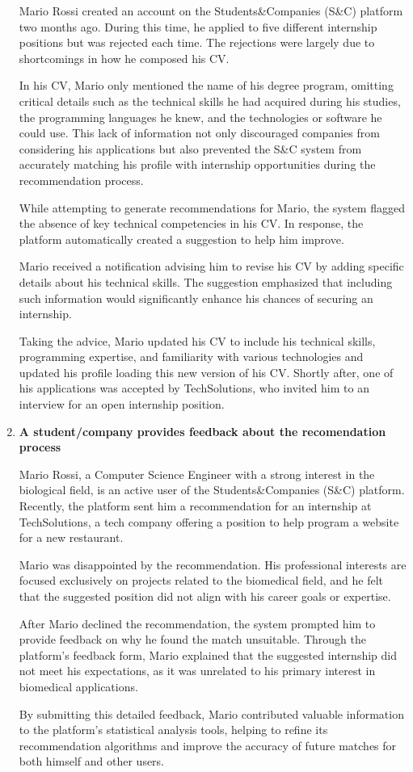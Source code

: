 \begin{enumerate}
     Mario Rossi created an account on the Students\&Companies (S\&C) platform two months ago. During this time, he applied to five different internship positions but was rejected each time. The rejections were largely due to shortcomings in how he composed his CV.

    In his CV, Mario only mentioned the name of his degree program, omitting critical details such as the technical skills he had acquired during his studies, the programming languages he knew, and the technologies or software he could use. This lack of information not only discouraged companies from considering his applications but also prevented the S\&C system from accurately matching his profile with internship opportunities during the recommendation process.

    While attempting to generate recommendations for Mario, the system flagged the absence of key technical competencies in his CV. In response, the platform automatically created a suggestion to help him improve.

    Mario received a notification advising him to revise his CV by adding specific details about his technical skills. The suggestion emphasized that including such information would significantly enhance his chances of securing an internship.

    Taking the advice, Mario updated his CV to include his technical skills, programming expertise, and familiarity with various technologies and updated his profile loading this new version of his CV. Shortly after, one of his applications was accepted by TechSolutions, who invited him to an interview for an open internship position.


     \item \textbf{A student/company provides feedback about the recomendation process}

     Mario Rossi, a Computer Science Engineer with a strong interest in the biological field, is an active user of the Students\&Companies (S\&C) platform. Recently, the platform sent him a recommendation for an internship at TechSolutions, a tech company offering a position to help program a website for a new restaurant.

    Mario was disappointed by the recommendation. His professional interests are focused exclusively on projects related to the biomedical field, and he felt that the suggested position did not align with his career goals or expertise.

    After Mario declined the recommendation, the system prompted him to provide feedback on why he found the match unsuitable. Through the platform's feedback form, Mario explained that the suggested internship did not meet his expectations, as it was unrelated to his primary interest in biomedical applications.

    By submitting this detailed feedback, Mario contributed valuable information to the platform’s statistical analysis tools, helping to refine its recommendation algorithms and improve the accuracy of future matches for both himself and other users.


      
\end{enumerate}


